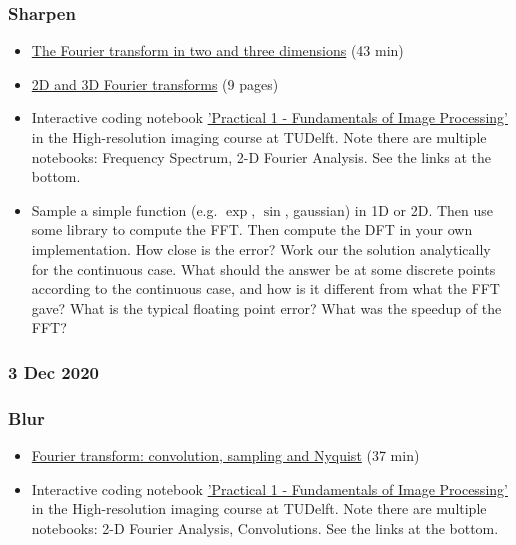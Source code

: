 \documentclass[11pt, oneside]{article}   	%
\begin{document}
\subsubsection{Sharpen}
\begin{itemize}
\item \href{https://yale.app.box.com/s/5kaneezyqqzl08w8gtt62z90apbo8u1p}{The Fourier transform in two and three dimensions} (43 min)
	\item \href{https://cryoemprinciples.yale.edu/sites/default/files/files/4%20Fourier2D-3D.pdf}{2D and 3D Fourier transforms} (9 pages)
	\item Interactive coding notebook \href{https://gitlab.tudelft.nl/aj-lab/teaching/-/wikis/NB4020}{'Practical 1 - Fundamentals of Image Processing'} in the High-resolution imaging course at TUDelft. Note there are multiple notebooks: Frequency Spectrum, 2-D Fourier Analysis. See the links at the bottom.

	
\end{itemize}
\begin{itemize}
	\item Sample a simple function (e.g. $\exp$, $\sin$, gaussian) in 1D or 2D. Then use some library to compute the FFT. Then compute the DFT in your own implementation. How close is the error? Work our the solution analytically for the continuous case. What should the answer be at some discrete points according to the continuous case, and how is it different from what the FFT gave? What is the typical floating point error? What was the speedup of the FFT?
\end{itemize}

\pagebreak
\subsubsection{3 Dec 2020}
\subsubsection{Blur}
\begin{itemize}
	\item \href{https://yale.app.box.com/s/00d0q34y1ef8qdfw3peo0r2jvcdf3hb3}{Fourier transform: convolution, sampling and Nyquist} (37 min)
	\item Interactive coding notebook \href{https://gitlab.tudelft.nl/aj-lab/teaching/-/wikis/NB4020}{'Practical 1 - Fundamentals of Image Processing'} in the High-resolution imaging course at TUDelft. Note there are multiple notebooks: 2-D Fourier Analysis, Convolutions. See the links at the bottom.

\end{itemize}
\end{document}
